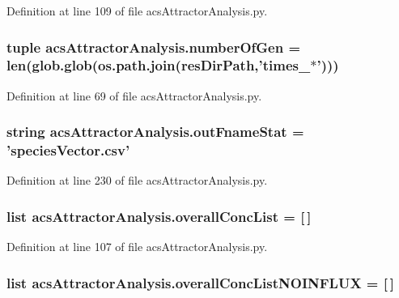 Definition at line 109 of file acs\-Attractor\-Analysis.\-py.

\hypertarget{a00090_ac014a9b46a060e4fed96eaee9614345b}{
\subsubsection[{number\-Of\-Gen}]{\setlength{\rightskip}{0pt plus 5cm}tuple acs\-Attractor\-Analysis.\-number\-Of\-Gen = len(glob.\-glob(os.\-path.\-join({\bf res\-Dir\-Path},'times\-\_\-$\ast$')))}}\label{a00090_ac014a9b46a060e4fed96eaee9614345b}


Definition at line 69 of file acs\-Attractor\-Analysis.\-py.

\hypertarget{a00090_aeecfcdefbc44b2b2ceff4c9b6f737f27}{
\subsubsection[{out\-Fname\-Stat}]{\setlength{\rightskip}{0pt plus 5cm}string acs\-Attractor\-Analysis.\-out\-Fname\-Stat = 'species\-Vector.\-csv'}}\label{a00090_aeecfcdefbc44b2b2ceff4c9b6f737f27}


Definition at line 230 of file acs\-Attractor\-Analysis.\-py.

\hypertarget{a00090_aca1d14f4dbff06c02b0e3e362c7ffe14}{
\subsubsection[{overall\-Conc\-List}]{\setlength{\rightskip}{0pt plus 5cm}list acs\-Attractor\-Analysis.\-overall\-Conc\-List = \mbox{[}$\,$\mbox{]}}}\label{a00090_aca1d14f4dbff06c02b0e3e362c7ffe14}


Definition at line 107 of file acs\-Attractor\-Analysis.\-py.

\hypertarget{a00090_a62444c9b0d66deb07c2e1091695e7561}{
\subsubsection[{overall\-Conc\-List\-N\-O\-I\-N\-F\-L\-U\-X}]{\setlength{\rightskip}{0pt plus 5cm}list acs\-Attractor\-Analysis.\-overall\-Conc\-List\-N\-O\-I\-N\-F\-L\-U\-X = \mbox{[}$\,$\mbox{]}}}\label{a00090_a62444c9b0d66deb07c2e1091695e7561}


